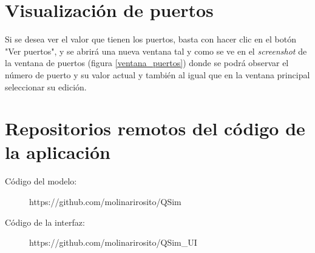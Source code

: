 
\section{Visualización de puertos}
Si se desea ver el valor que tienen los puertos, basta con hacer clic en el botón "Ver puertos", y se abrirá una nueva ventana tal y como se ve en el \textit{screenshot} de la ventana de puertos (figura \ref{ventana_puertos}) donde se podrá observar el número de puerto y su valor actual y también al igual que en la ventana principal seleccionar su edición.
\\


\section{Repositorios remotos del código de la aplicación}

\begin{description}
\item[Código del modelo:]
https://github.com/molinarirosito/QSim
\item[Código de la interfaz:]
https://github.com/molinarirosito/QSim\_UI
\end{description}
